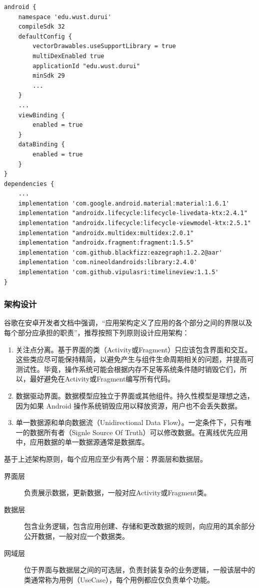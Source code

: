 \documentclass[12pt, a4paper, UTF8]{ctexart}
\begin{document}
\begin{verbatim}
android {
    namespace 'edu.wust.durui'
    compileSdk 32
    defaultConfig {
        vectorDrawables.useSupportLibrary = true
        multiDexEnabled true
        applicationId "edu.wust.durui"
        minSdk 29
        ...
    }
    ...
    viewBinding {
        enabled = true
    }
    dataBinding {
        enabled = true
    }
}
dependencies {
    ...
    implementation 'com.google.android.material:material:1.6.1'
    implementation "androidx.lifecycle:lifecycle-livedata-ktx:2.4.1"
    implementation "androidx.lifecycle:lifecycle-viewmodel-ktx:2.5.1"
    implementation "androidx.multidex:multidex:2.0.1"
    implementation "androidx.fragment:fragment:1.5.5"
    implementation 'com.github.blackfizz:eazegraph:1.2.2@aar'
    implementation 'com.nineoldandroids:library:2.4.0'
    implementation 'com.github.vipulasri:timelineview:1.1.5'
}
\end{verbatim}

\subsubsection{架构设计}
谷歌在安卓开发者文档中强调，“应用架构定义了应用的各个部分之间的界限以及每个部分应承担的职责”，推荐按照下列原则设计应用架构：
\begin{enumerate}
    \item 关注点分离。基于界面的类（Activity或Fragment）只应该包含界面和交互。这些类应尽可能保持精简，以避免产生与组件生命周期相关的问题，并提高可测试性。毕竟，操作系统可能会根据内存不足等系统条件随时销毁它们，所以，最好避免在Activity或Fragment编写所有代码。
    \item 数据驱动界面。数据模型应独立于界面或其他组件。持久性模型是理想之选，因为如果 Android 操作系统销毁应用以释放资源，用户也不会丢失数据。
    \item 单一数据源和单向数据流（Unidirectional Data Flow）。一定条件下，只有唯一的数据所有者（Signle Source Of Truth）可以修改数据。在离线优先应用中，应用数据的单一数据源通常是数据库。
\end{enumerate}

基于上述架构原则，每个应用应至少有两个层：界面层和数据层。
\begin{description}
    \item[界面层] 负责展示数据，更新数据，一般对应Activity或Fragment类。
    \item[数据层] 包含业务逻辑，包含应用创建、存储和更改数据的规则，向应用的其余部分公开数据，一般对应一个数据类。
    \item[网域层] 位于界面与数据层之间的可选层，负责封装复杂的业务逻辑，一般该层中的类通常称为用例（UseCase），每个用例都应仅负责单个功能。
\end{description}
\end{document}
